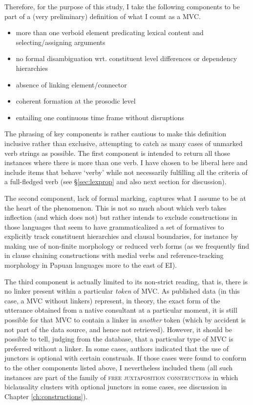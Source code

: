 Therefore, for the purpose of this study, I take the following components to be part of a (very preliminary) definition of what I count as a MVC.


\begin{itemize}
\item more than one verboid element predicating lexical content and selecting/assigning arguments
\item no formal disambiguation wrt. constituent level differences or dependency hierarchies
\item absence of linking element/connector
\item coherent formation at the prosodic level
\item entailing one continuous time frame without disruptions
\end{itemize} 

The phrasing of key components is rather cautious to make this definition inclusive rather than exclusive, attempting to catch as many cases of unmarked verb strings as possible. The first component is intended to return all those instances where there is more than one verb. I have chosen to be liberal here and include items that behave `verby' while not necessarily fulfilling all the criteria of a full-fledged verb (see §\ref{sec:lexprop} and also next section for discussion). 

The second component, lack of formal marking, captures what I assume to be at the heart of the phenomenon. This is not so much about which verb takes inflection (and which does not) but rather intends to exclude constructions in those languages that seem to have grammaticalized a set of formatives to explicitly track constituent hierarchies and clausal boundaries, for instance by making use of non-finite morphology or reduced verb forms (as we frequently find in clause chaining constructions with medial verbs and reference-tracking morphology in Papuan languages more to the east of EI). 

The third component is actually limited to its non-strict reading, that is, there is no linker present within a particular \emph{token} of MVC. As published data (in this case, a MVC without linkers) represent, in theory, the exact form of the utterance obtained from a native consultant at a particular moment, it is still possible for that MVC to contain a linker in \emph{another} token (which by accident is not part of the data source, and hence not retrieved). However, it should be possible to tell, judging from the database, that a particular type of MVC is preferred without a linker. In some cases, authors indicated that the use of junctors is optional with certain construals. If those cases were found to conform to the other components listed above, I nevertheless included them (all such instances are part of the family of \textsc{free juxtaposition construction}s in which biclausality clusters with optional junctors in some cases, see discussion in Chapter \ref{ch:constructions}).

